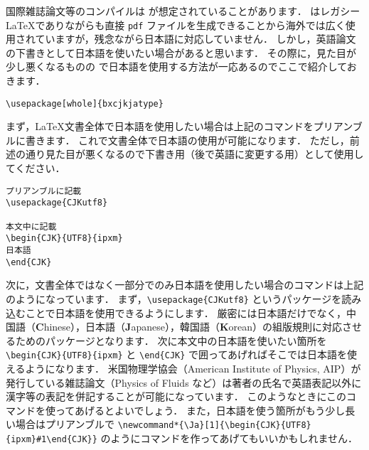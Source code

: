 国際雑誌論文等のコンパイルは \pdfLaTeX が想定されていることがあります．
\pdfLaTeX はレガシー \LaTeX でありながらも直接 \verb|pdf| ファイルを生成できることから海外では広く使用されていますが，残念ながら日本語に対応していません．
しかし，英語論文の下書きとして日本語を使いたい場合があると思います．
その際に，見た目が少し悪くなるものの \pdfLaTeX で日本語を使用する方法が一応あるのでここで紹介しておきます．

\begin{tcolorbox}[title={文書全体で日本語を使用}]
\begin{verbatim}
\usepackage[whole]{bxcjkjatype}
\end{verbatim}
\end{tcolorbox}

まず，\LaTeX 文書全体で日本語を使用したい場合は上記のコマンドをプリアンブルに書きます．
これで文書全体で日本語の使用が可能になります．
ただし，前述の通り見た目が悪くなるので下書き用（後で英語に変更する用）として使用してください．

\begin{tcolorbox}[title={文書の一部分で日本語を使用}]
\begin{verbatim}
プリアンブルに記載
\usepackage{CJKutf8}

本文中に記載
\begin{CJK}{UTF8}{ipxm}
日本語
\end{CJK}
\end{verbatim}
\end{tcolorbox}

次に，文書全体ではなく一部分でのみ日本語を使用したい場合のコマンドは上記のようになっています．
まず，\verb|\usepackage{CJKutf8}| というパッケージを読み込むことで日本語を使用できるようにします．
厳密には日本語だけでなく，中国語（\textbf{C}hinese），日本語（\textbf{J}apanese），韓国語（\textbf{K}orean）の組版規則に対応させるためのパッケージとなります．
次に本文中の日本語を使いたい箇所を \verb|\begin{CJK}{UTF8}{ipxm}| と \verb|\end{CJK}| で囲ってあげればそこでは日本語を使えるようになります．
米国物理学協会（American Institute of Physics, AIP）が発行している雑誌論文（Physics of Fluids など）は著者の氏名で英語表記以外に漢字等の表記を併記することが可能になっています．
このようなときにこのコマンドを使ってあげるとよいでしょう．
また，日本語を使う箇所がもう少し長い場合はプリアンブルで \verb|\newcommand*{\Ja}[1]{\begin{CJK}{UTF8}{ipxm}#1\end{CJK}}| のようにコマンドを作ってあげてもいいかもしれません．

